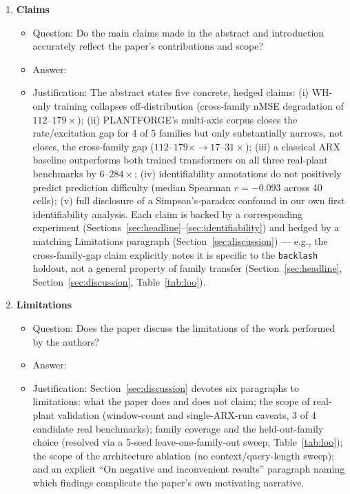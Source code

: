 \documentclass{article}
\begin{document}
\begin{enumerate}

\item {\bf Claims}
  \begin{itemize}
    \item Question: Do the main claims made in the abstract and introduction accurately reflect the paper's contributions and scope?
    \item Answer: \answerYes{}
    \item Justification: The abstract states five concrete, hedged claims: (i) WH-only training collapses off-distribution (cross-family nMSE degradation of $112$--$179\times$); (ii) PLANTFORGE's multi-axis corpus closes the rate/excitation gap for 4 of 5 families but only substantially narrows, not closes, the cross-family gap ($112$--$179\times \to 17$--$31\times$); (iii) a classical ARX baseline outperforms both trained transformers on all three real-plant benchmarks by $6$--$284\times$; (iv) identifiability annotations do not positively predict prediction difficulty (median Spearman $r=-0.093$ across 40 cells); (v) full disclosure of a Simpson's-paradox confound in our own first identifiability analysis. Each claim is backed by a corresponding experiment (Sections~\ref{sec:headline}--\ref{sec:identifiability}) and hedged by a matching Limitations paragraph (Section~\ref{sec:discussion}) --- e.g., the cross-family-gap claim explicitly notes it is specific to the \texttt{backlash} holdout, not a general property of family transfer (Section~\ref{sec:headline}, Section~\ref{sec:discussion}, Table~\ref{tab:loo}).
  \end{itemize}

\item {\bf Limitations}
  \begin{itemize}
    \item Question: Does the paper discuss the limitations of the work performed by the authors?
    \item Answer: \answerYes{}
    \item Justification: Section~\ref{sec:discussion} devotes six paragraphs to limitations: what the paper does and does not claim; the scope of real-plant validation (window-count and single-ARX-run caveats, 3 of 4 candidate real benchmarks); family coverage and the held-out-family choice (resolved via a 5-seed leave-one-family-out sweep, Table~\ref{tab:loo}); the scope of the architecture ablation (no context/query-length sweep); and an explicit ``On negative and inconvenient results'' paragraph naming which findings complicate the paper's own motivating narrative.
  \end{itemize}


\end{enumerate}
\end{document}
